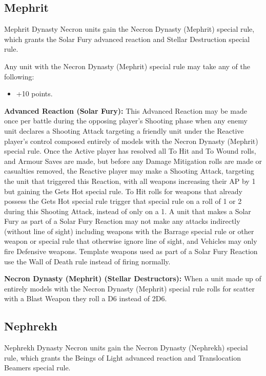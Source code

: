 \subsection{Mephrit}

Mephrit Dynasty Necron units gain the Necron Dynasty (Mephrit) special rule, which grants the Solar Fury advanced reaction and Stellar Destruction special rule.

Any unit with the Necron Dynasty (Mephrit) special rule may take any of the following:
\begin{itemize}
	\item {} \dotfill +10 points.
\end{itemize}

\textbf{Advanced Reaction (Solar Fury):} This Advanced Reaction may be made once per battle during the opposing player’s Shooting phase when any enemy unit declares a Shooting Attack targeting a friendly unit under the Reactive player’s control composed entirely of models with the Necron Dynasty (Mephrit) special rule. Once the Active player has resolved all To Hit and To Wound rolls, and Armour Saves are made, but before any Damage Mitigation rolls are made or casualties removed, the Reactive player may make a Shooting Attack, targeting the unit that triggered this Reaction, with all weapons increasing their AP by 1 but gaining the Gets Hot special rule. To Hit rolls for weapons that already possess the Gets Hot special rule trigger that special rule on a roll of 1 or 2 during this Shooting Attack, instead of only on a 1. A unit that makes a Solar Fury as part of a Solar Fury Reaction may not make any attacks indirectly (without line of sight) including weapons with the Barrage special rule or other weapon or special rule that otherwise ignore line of sight, and Vehicles may only fire Defensive weapons. Template weapons used as part of a Solar Fury Reaction use the Wall of Death rule instead of firing normally.

\textbf{Necron Dynasty (Mephrit) (Stellar Destructors):}  When a unit made up of entirely models with the Necron Dynasty (Mephrit) special rule rolls for scatter with a Blast Weapon they roll a D6 instead of 2D6.


\subsection{Nephrekh}

Nephrekh Dynasty Necron units gain the Necron Dynasty (Nephrekh) special rule, which grants the Beings of Light advanced reaction and Translocation Beamers special rule.

